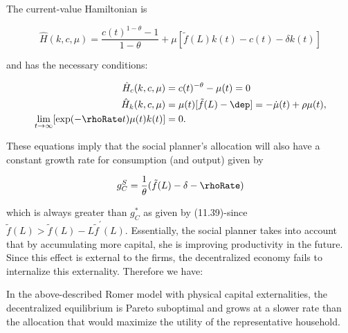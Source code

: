 \documentclass[\topdir/lecture\_notes.tex]{subfiles}
\begin{document}
The current-value Hamiltonian is

\[
\hat{H}(k, c, \mu)=\frac{c(t)^{1-\theta}-1}{1-\theta}+\mu[\tilde{f}(L) k(t)-c(t)-\delta k(t)]
\]

and has the necessary conditions:

\[
\begin{aligned}
\hat{H}_{c}(k, c, \mu) & =c(t)^{-\theta}-\mu(t)=0 \\
\hat{H}_{k}(k, c, \mu) & =\mu(t)[\tilde{f}(L)-\dep]=-\dot{\mu}(t)+\rho \mu(t), \\
\lim _{t \rightarrow \infty}[\exp(-\rhoRate t) \mu(t) k(t)] & =0 .
\end{aligned}
\]

These equations imply that the social planner's allocation will also have a constant growth rate for consumption (and output) given by

\[
g_{C}^{S}=\frac{1}{\theta}(\tilde{f}(L)-\delta-\rhoRate)
\]

which is always greater than $g_{C}^{*}$ as given by (11.39)-since $\tilde{f}(L)>\tilde{f}(L)-L \tilde{f}^{\prime}(L)$. Essentially, the social planner takes into account that by accumulating more capital, she is improving productivity in the future. Since this effect is external to the firms, the decentralized economy fails to internalize this externality. Therefore we have:

\begin{proposition}
In the above-described Romer model with physical capital externalities, the decentralized equilibrium is Pareto suboptimal and grows at a slower rate than the allocation that would maximize the utility of the representative household.
\end{proposition}
\end{document}
